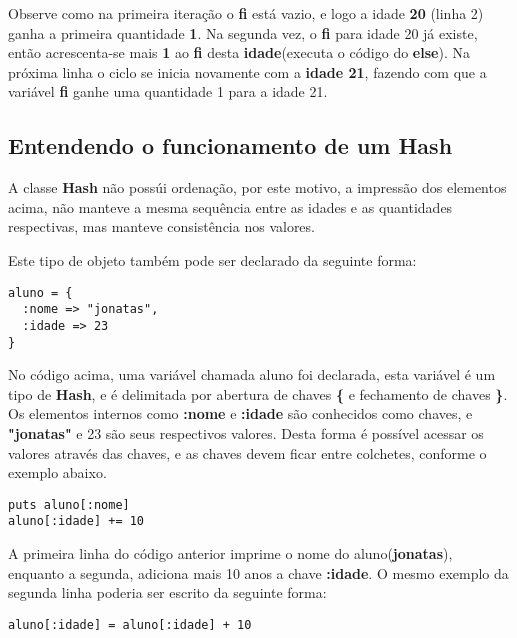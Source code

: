 \documentclass[espaco=simples,appendix=Name]{abnt}
\begin{document}
Observe como na primeira iteração o \textbf{fi} está vazio, e logo a idade \textbf{20} (linha 2) ganha a primeira quantidade \textbf{1}. Na segunda vez, o \textbf{fi} para idade 20 já existe, então acrescenta-se mais \textbf{1} ao \textbf{fi} desta \textbf{idade}(executa o código do \textbf{else}). Na próxima linha o ciclo se inicia novamente com a \textbf{idade 21}, fazendo com que a variável \textbf{fi} ganhe uma quantidade 1 para a idade 21.


\subsection { Entendendo o funcionamento de um Hash }

A classe \textbf{Hash} não possúi ordenação, por este motivo, a impressão dos elementos acima, não manteve a mesma sequência entre as idades e as quantidades respectivas, mas manteve consistência nos valores.

Este tipo de objeto também pode ser declarado da seguinte forma:

\begin{lstlisting}[caption=Sintaxe de declaração de um \textbf{Hash}]
aluno = { 
  :nome => "jonatas",
  :idade => 23
}
\end{lstlisting}

No código acima, uma variável chamada aluno foi declarada, esta variável é um tipo de \textbf{Hash}, e é delimitada por abertura de chaves \textbf{\{} e fechamento de chaves \textbf{\}}. Os elementos internos como \textbf{:nome} e \textbf{:idade} são conhecidos como chaves, e \textbf{"jonatas"} e 23 são seus respectivos valores. Desta forma é possível acessar os valores através das chaves, e as chaves devem ficar entre colchetes, conforme o exemplo abaixo. 


\begin{lstlisting}[caption=Usufruindo dos métodos do \textbf{Hash}]
puts aluno[:nome] 
aluno[:idade] += 10
\end{lstlisting}

A primeira linha do código anterior imprime o nome do aluno(\textbf{jonatas}), enquanto a segunda, adiciona mais 10 anos a chave \textbf{:idade}. O mesmo exemplo da segunda linha poderia ser escrito da seguinte forma:

\begin{lstlisting}[caption=Somando 10 anos a chave :idade]
aluno[:idade] = aluno[:idade] + 10
\end{lstlisting}
\end{document}
